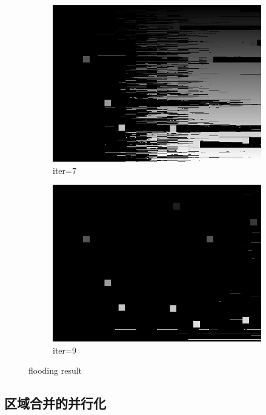 \documentclass[a4paper, 11pt]{article}
\begin{document}
\begin{figure}[H]
	\begin{subfigure}[b]{0.3\textwidth}
		\centering
		\includegraphics[width=\textwidth]{images/cuda_fl/result/7.png}
		\caption{iter=7}
	\end{subfigure}
	\hspace{5mm}
	\begin{subfigure}[b]{0.3\textwidth}
		\centering
		\includegraphics[width=\textwidth]{images/cuda_fl/result/9.png}
		\caption{iter=9}
	\end{subfigure}
	
	\caption{flooding result}
	\label{fig:cuda_fl_3}
\end{figure}


\subsection{区域合并的并行化}
\end{document}
